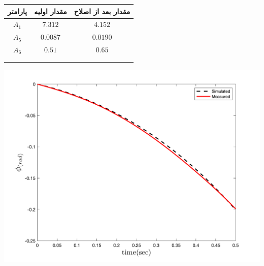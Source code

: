   \begin{minipage}[H]{\linewidth}
	\hfill
	\begin{minipage}[b]{0.49\linewidth}
		\centering
		\begin{tabular}{ccc}\hline
			 پارامتر & مقدار اولیه  & مقدار بعد از اصلاح
			 \\ \hline
			$A_1$  & $7.312$ & $4.152$ \\
			$A_5$ & $0.0087$ & $0.0190$\\
			$A_6$ & $0.51$ & $0.65$\\ \hline
			\\\\
		\end{tabular}
	\captionsetup{justification=centering}
	\end{minipage}
	\begin{minipage}[b]{0.48\linewidth}
		\centering
		\captionsetup{justification=centering}
		\includegraphics[width=1\linewidth]{../Figures/RCP/roll_ml_parameter_estimation/RCP_roll_S2.png}
	\end{minipage}
\end{minipage}

\vspace{0.5cm}
